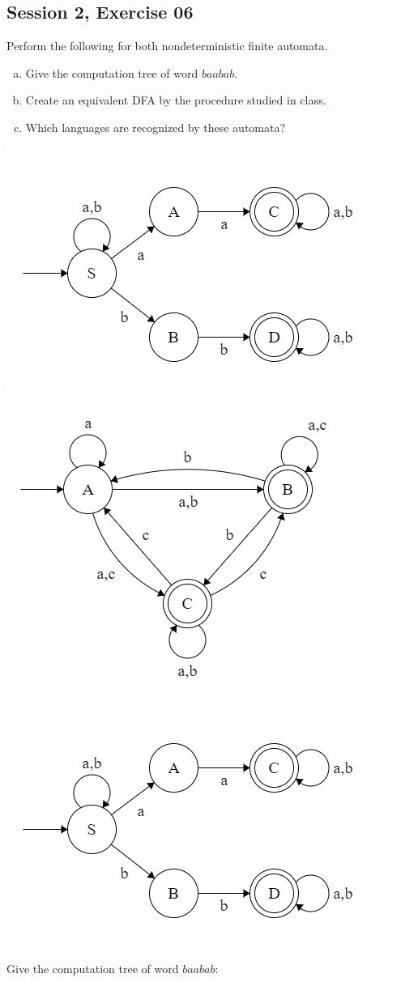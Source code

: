 \subsection{Session 2, Exercise 06}


Perform the following for both nondeterministic finite automata.
\begin{enumerate}[a.)]
    \item Give the computation tree of word $baabab$.
    \item Create an equivalent DFA by the procedure studied in class.
    \item Which languages are recognized by these automata?
\end{enumerate}

\includegraphics[width=0.5\linewidth]{02/2_6_1_automaton.png}

\includegraphics[width=0.5\linewidth]{02/2_6_2_automaton.png}


\includegraphics[width=0.5\linewidth]{02/2_6_1_automaton.png}

Give the computation tree of word $baabab$:


